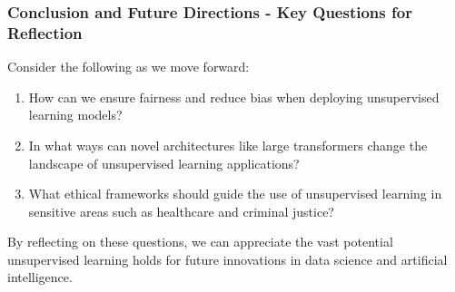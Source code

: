 \documentclass[aspectratio=169]{beamer}
\begin{document}
\begin{frame}[fragile]
    \frametitle{Conclusion and Future Directions - Key Questions for Reflection}
    Consider the following as we move forward:
    
    \begin{enumerate}
        \item How can we ensure fairness and reduce bias when deploying unsupervised learning models?
        \item In what ways can novel architectures like large transformers change the landscape of unsupervised learning applications?
        \item What ethical frameworks should guide the use of unsupervised learning in sensitive areas such as healthcare and criminal justice?
    \end{enumerate}
    
    By reflecting on these questions, we can appreciate the vast potential unsupervised learning holds for future innovations in data science and artificial intelligence.
\end{frame}
\end{document}
